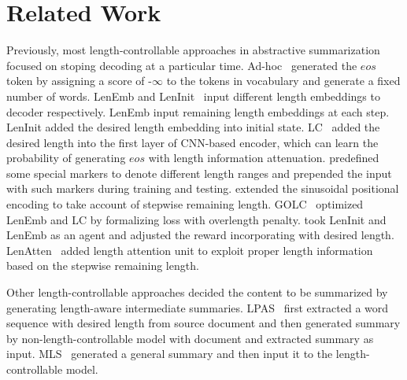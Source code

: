 \section{Related Work}
\label{sec:related}

Previously, most length-controllable approaches in abstractive summarization
focused on stoping decoding at a particular time.
Ad-hoc~\cite{RushCW15} generated the $eos$ token by 
assigning a score of -$\infty$ to the tokens in vocabulary and 
generate a fixed number of words. 
LenEmb and LenInit~\cite{KikuchiNSTO16} input different length embeddings to decoder respectively.
LenEmb input remaining length embeddings at each step.
LenInit added the desired length embedding into initial state. 
LC~\cite{LiuLZ18} added the desired length into the first layer of CNN-based encoder, which can learn the probability of generating $eos$ with length information attenuation.
\citet{FanGA18} predefined some special markers to denote different length ranges and prepended the input with such markers during training and testing. 
\citet{pos19} extended the sinusoidal positional encoding to take account of stepwise remaining length.
GOLC~\cite{GOLC19} optimized LenEmb and LC by formalizing loss with overlength penalty.
\citet{RLLC19} took LenInit and LenEmb as an agent and adjusted the reward incorporating with desired length.
LenAtten~\cite{lenatten21} added length attention unit to exploit proper length information based on the stepwise remaining length. 

Other length-controllable approaches decided the content to be summarized by generating length-aware intermediate summaries.
LPAS~\cite{Proto20} first extracted a word sequence with desired length from source document and then generated summary by non-length-controllable model with document and extracted summary as input.
MLS~\cite{Compress20} generated a general summary
and then input it to the length-controllable model.

